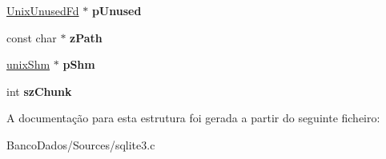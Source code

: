 \begin{DoxyCompactItemize}
\item 
\hypertarget{structunix_file_a3820ccead5805d2ea61ca1c752646852}{\hyperlink{struct_unix_unused_fd}{Unix\-Unused\-Fd} $\ast$ {\bfseries p\-Unused}}\label{structunix_file_a3820ccead5805d2ea61ca1c752646852}

\item 
\hypertarget{structunix_file_afc5eff0948d553308cf90a79d4a06f17}{const char $\ast$ {\bfseries z\-Path}}\label{structunix_file_afc5eff0948d553308cf90a79d4a06f17}

\item 
\hypertarget{structunix_file_a53c653bd73cdc6f518ecffe95062e91a}{\hyperlink{structunix_shm}{unix\-Shm} $\ast$ {\bfseries p\-Shm}}\label{structunix_file_a53c653bd73cdc6f518ecffe95062e91a}

\item 
\hypertarget{structunix_file_a5f6307d3446ce1b149df756c00c3bd2e}{int {\bfseries sz\-Chunk}}\label{structunix_file_a5f6307d3446ce1b149df756c00c3bd2e}

\end{DoxyCompactItemize}


A documentação para esta estrutura foi gerada a partir do seguinte ficheiro\-:\begin{DoxyCompactItemize}
\item 
Banco\-Dados/\-Sources/sqlite3.\-c\end{DoxyCompactItemize}
